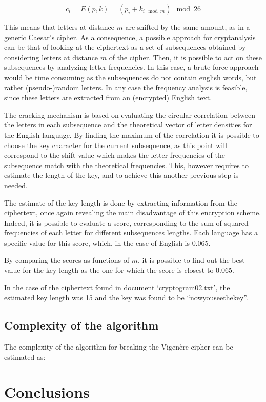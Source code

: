 \documentclass[12pt]{article}
\begin{document}
\begin{equation*}
  c_i = E(p,k) = (p_i + k_{i\mod{m}})\mod{26}
\end{equation*}

This means that letters at distance $m$ are shifted by the same amount, as in a generic Caesar's cipher.
As a consequence, a possible approach for cryptanalysis can be that of looking at the ciphertext as a set of subsequences obtained by considering letters at distance $m$ of the cipher. 
Then, it is possible to act on these subsequences by analyzing letter frequencies. In this case, a brute force approach would be time consuming as the subsequences do not contain english words, but rather (pseudo-)random letters. 
In any case the frequency analysis is feasible, since these letters are extracted from an (encrypted) English text.

The cracking mechanism is based on evaluating the circular correlation between the letters in each subsequence and the theoretical vector of letter densities for the English language. 
By finding the maximum of the correlation it is possible to choose the key character for the current subsequence, as this point will correspond to the shift value which makes the letter frequencies of the subsequence match with the theoretical frequencies.
This, however requires to estimate the length of the key, and to achieve this another previous step is needed.

The estimate of the key length is done by extracting information from the ciphertext, once again revealing the main disadvantage of this encryption scheme.
Indeed, it is possible to evaluate a score, corresponding to the sum of squared frequencies of each letter for different subsequences lengths.
Each language has a specific value for this score, which, in the case of English is 0.065.

By comparing the scores as functions of $m$, it is possible to find out the best value for the key length as the one for which the score is closest to 0.065.

In the case of the ciphertext found in document `cryptogram02.txt', the estimated key length was 15 and the key was found to be ``nowyouseethekey''.

\subsection{Complexity of the algorithm}

The complexity of the algorithm for breaking the Vigenère cipher can be estimated as:

%

\section{Conclusions}


\pagebreak
\end{document}
